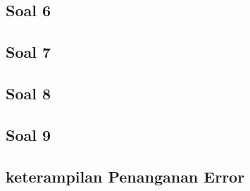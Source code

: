 \subsection{Soal 6}

\subsection{Soal 7}

\subsection{Soal 8}

\subsection{Soal 9}

\subsection{keterampilan Penanganan Error}
